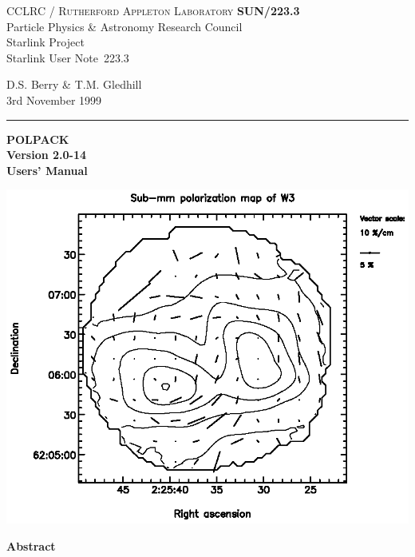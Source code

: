 \documentclass[twoside,11pt]{article}
\newcommand{\stardoccategory}  {Starlink User Note}
\newcommand{\stardocinitials}  {SUN}
\newcommand{\stardocnumber}    {223.3}
\newcommand{\stardocauthors}   {D.S. Berry \& T.M. Gledhill }
\newcommand{\stardocdate}      {3rd November 1999}
\newcommand{\stardoctitle}     {POLPACK}
\newcommand{\stardocversion}   {Version 2.0-14}
\newcommand{\stardocmanual}    {Users' Manual}
\newcommand{\stardocname}{\stardocinitials /\stardocnumber}
\newenvironment{latexonly}{}{}
\renewcommand{\_}{\texttt{\symbol{95}}}
\begin{document}
\thispagestyle{empty}

\begin{latexonly}
   CCLRC / \textsc{Rutherford Appleton Laboratory} \hfill \textbf{\stardocname}\\
   {\large Particle Physics \& Astronomy Research Council}\\
   {\large Starlink Project\\}
   {\large \stardoccategory\ \stardocnumber}
   \begin{flushright}
   \stardocauthors\\
   \stardocdate
   \end{flushright}
   \vspace{-4mm}
   \rule{\textwidth}{0.5mm}
   \vspace{5mm}
   \begin{center}
   {\Huge\textbf{\stardoctitle \\ [2.5ex]}}
   {\LARGE\textbf{\stardocversion \\ [4ex]}}
   {\Huge\textbf{\stardocmanual}}
   \end{center}
   \vspace{5mm}

   \begin{center}
   \includegraphics[clip,scale=1.0]{sun223_figures/fig.eps}
   \end{center}

   \vspace{5mm}
   \begin{center}
      {\Large\textbf{Abstract}}
   \end{center}
\end{latexonly}
\end{document}
